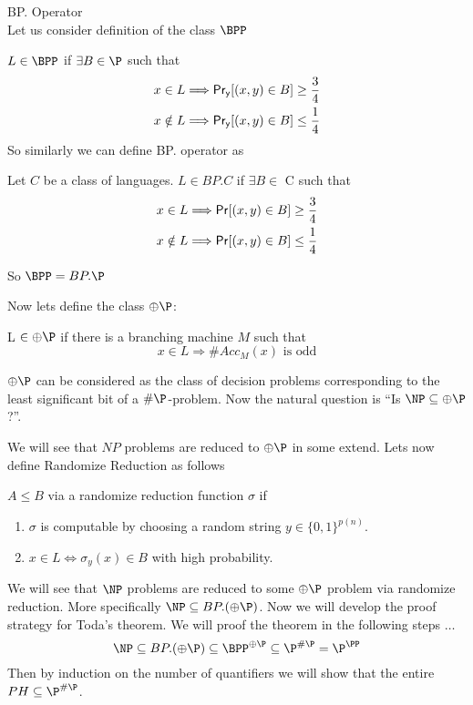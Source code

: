 \begin{definition}
BP. Operator \\
Let us consider definition of the class $\BPP$ 

$L \in \BPP$ if $\exists B \in \P$ such that 
\begin{align*}
x \in L & \Longrightarrow {\sf Pr_y}[(x,y) \in B ] \ge \frac{3}{4} \\
x \notin L & \Longrightarrow {\sf Pr_y}[(x,y) \in B] \le \frac{1}{4}
\end{align*}
So similarly we can define BP. operator as 


\begin{center}
Let $C$ be a class of languages. 
$L \in BP.C$ if $ \exists B \in$ C such that
\begin{align*}
x \in L & \Longrightarrow {\sf Pr}[(x,y) \in B]  \ge \frac{3}{4}\\
x \notin L & \Longrightarrow {\sf Pr}[(x,y) \in B] \le \frac{1}{4}
\end{align*}
\end{center}
So $\BPP = BP.\P$
\end{definition}

Now lets define the class $\oplus \P$:
\begin{definition}
L $\in \oplus \P$ if there is a branching machine $M$ such that
\[ x \in L \Longrightarrow \#Acc_M(x) \text{ is odd} \]
\end{definition}

$\oplus\P$ can be considered as the class of decision problems corresponding 
to the least significant bit of a $\#\P$-problem. Now the natural 
question is ``Is $\NP \subseteq \oplus\P$?''.

We will see that $NP$ problems are reduced to $\oplus\P$ in some extend.
Lets now define Randomize Reduction as follows
\begin{definition}
$A \le B$ via a randomize reduction function $\sigma$ if 
\begin{enumerate}
\item  $\sigma$ is computable by choosing a random string 
$y \in \{0,1\}^{p(n)}$.
\item $x \in L \iff \sigma_y(x) \in B$ with high probability.
\end{enumerate}
\end{definition}

We will see that $\NP$ problems are reduced to some $\oplus\P$ problem 
via randomize reduction. More specifically $\NP \subseteq BP.(\oplus \P)$.
Now we will develop the proof strategy for Toda's theorem. 
We will proof the theorem in the following steps $\ldots$ 
\[
\NP \subseteq BP.(\oplus \P) \subseteq \BPP^{\oplus \P} \subseteq 
\P^{\#\P}=\P^{\PP} \]
Then by induction on the number of quantifiers we will show that the 
entire $PH \subseteq \P^{\#\P}$.

